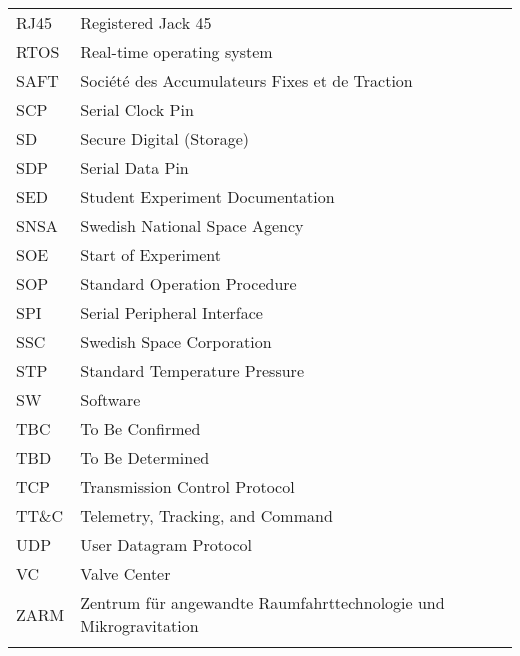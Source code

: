 \begin{longtable}{p{3cm} p{9cm}}
             RJ45        & Registered Jack 45 \\
             RTOS        & Real-time operating system\\
             SAFT        & Soci\'{e}t\'{e} des Accumulateurs Fixes et de Traction\\
             SCP         & Serial Clock Pin\\
             SD          & Secure Digital (Storage) \\
             SDP         & Serial Data Pin\\
             SED         & Student Experiment Documentation \\
             SNSA        & Swedish National Space Agency \\
             SOE         & Start of Experiment\\
             SOP         & Standard Operation Procedure\\
             SPI         & Serial Peripheral Interface\\
             SSC         & Swedish Space Corporation \\
             STP         & Standard Temperature Pressure\\
             SW          & Software\\
             TBC         & To Be Confirmed\\
             TBD         & To Be Determined \\
             TCP         & Transmission Control Protocol\\
             TT$\&$C     & Telemetry, Tracking, and Command\\
             UDP         & User Datagram Protocol\\
             VC          & Valve Center\\
             ZARM        & Zentrum f{\"u}r angewandte Raumfahrttechnologie und Mikrogravitation \\
         \label{tab:abbrevi}
     \end{longtable}
     \raggedbottom
